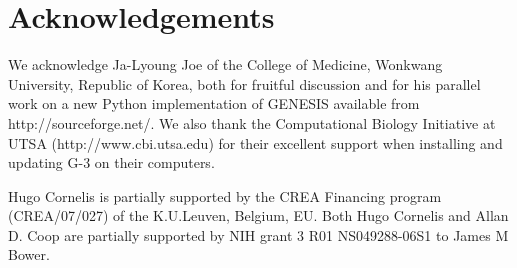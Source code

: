 \documentclass[12pt]{article}
\begin{document}
\section*{Acknowledgements}
We acknowledge Ja-Lyoung Joe of the College of Medicine, Wonkwang University, Republic of Korea, both for fruitful discussion and for his parallel work on a new Python implementation of GENESIS available from
http://sourceforge.net/. We also thank the Computational Biology Initiative at UTSA (http://www.cbi.utsa.edu) for their excellent support when installing and updating G-3 on their computers.

Hugo Cornelis is partially supported by the CREA Financing program (CREA/07/027) of the K.U.Leuven, Belgium, EU. Both Hugo Cornelis and Allan D. Coop are partially supported by NIH grant 3 R01 NS049288-06S1 to James M Bower.

\cleardoublepage
{}
%

%
%
%


\end{document}
